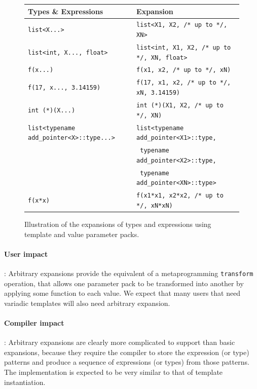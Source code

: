 \documentclass{article}
\begin{document}
\begin{figure}[h]
\centering
\begin{tabular}{l|l}
\textbf{Types \& Expressions} & \textbf{Expansion} \\\hline
\texttt{list<X...>} & \texttt{list<X1, X2, /* up to */, XN>} \\
\texttt{list<int, X..., float>} & \texttt{list<int, X1, X2, /* up to */, XN,
  float>} \\
\texttt{f(x...)} & \texttt{f(x1, x2, /* up to */, xN)} \\
\texttt{f(17, x..., 3.14159)} & \texttt{f(17, x1, x2, /* up to */, xN,
  3.14159)} \\
\texttt{int (*)(X...)} & \texttt{int (*)(X1, X2, /* up to */, XN)} \\
\texttt{list<typename add\_pointer<X>::type...>} &
\texttt{list<typename add\_pointer<X1>::type,} \\
& \qquad\texttt{{ }typename add\_pointer<X2>::type,} \\
& \qquad\texttt{{ }typename add\_pointer<XN>::type>} \\

\texttt{f(x*x)} & \texttt{f(x1*x1, x2*x2, /* up to */, xN*xN)} \\
\end{tabular}
\caption{Illustration of the expansions of types and
  expressions using template and value parameter packs.}
\label{fig:expansions}
\end{figure}

\paragraph{User impact}: Arbitrary expansions provide the equivalent
of a metaprogramming \texttt{transform} operation, that allows one
parameter pack to be transformed into another by applying some
function to each value. We expect that many users that need variadic
templates will also need arbitrary expansion.

\paragraph{Compiler impact}: Arbitrary expansions are clearly more
complicated to support than basic expansions, because they require the
compiler to store the expression (or type) patterns and produce a
sequence of expressions (or types) from those patterns. The
implementation is expected to be very similar to that of template
instantiation.
\end{document}
